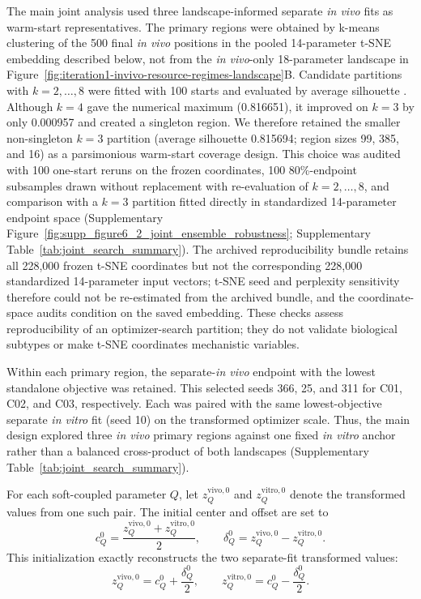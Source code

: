 \documentclass[11pt]{article}
\begin{document}
The main joint analysis used three landscape-informed separate \textit{in vivo} fits as warm-start representatives. The primary regions were obtained by k-means clustering of the 500 final \textit{in vivo} positions in the pooled 14-parameter t-SNE embedding described below, not from the \textit{in vivo}-only 18-parameter landscape in Figure~\ref{fig:iteration1-invivo-resource-regimes-landscape}B. Candidate partitions with $k=2,\ldots,8$ were fitted with 100 starts and evaluated by average silhouette \cite{rousseeuw_silhouettes_1987}. Although $k=4$ gave the numerical maximum (0.816651), it improved on $k=3$ by only 0.000957 and created a singleton region. We therefore retained the smaller non-singleton $k=3$ partition (average silhouette 0.815694; region sizes 99, 385, and 16) as a parsimonious warm-start coverage design. This choice was audited with 100 one-start reruns on the frozen coordinates, 100 80\%-endpoint subsamples drawn without replacement with re-evaluation of $k=2,\ldots,8$, and comparison with a $k=3$ partition fitted directly in standardized 14-parameter endpoint space (Supplementary Figure~\ref{fig:supp_figure6_2_joint_ensemble_robustness}; Supplementary Table~\ref{tab:joint_search_summary}). The archived reproducibility bundle retains all 228,000 frozen t-SNE coordinates but not the corresponding 228,000 standardized 14-parameter input vectors; t-SNE seed and perplexity sensitivity therefore could not be re-estimated from the archived bundle, and the coordinate-space audits condition on the saved embedding. These checks assess reproducibility of an optimizer-search partition; they do not validate biological subtypes or make t-SNE coordinates mechanistic variables.

Within each primary region, the separate-\textit{in vivo} endpoint with the lowest standalone objective was retained. This selected seeds 366, 25, and 311 for C01, C02, and C03, respectively. Each was paired with the same lowest-objective separate \textit{in vitro} fit (seed 10) on the transformed optimizer scale. Thus, the main design explored three \textit{in vivo} primary regions against one fixed \textit{in vitro} anchor rather than a balanced cross-product of both landscapes (Supplementary Table~\ref{tab:joint_search_summary}).

For each soft-coupled parameter $Q$, let $z_Q^{\mathrm{vivo},0}$ and $z_Q^{\mathrm{vitro},0}$ denote the transformed values from one such pair. The initial center and offset are set to
\begin{equation}
c_Q^{0} = \frac{z_Q^{\mathrm{vivo},0} + z_Q^{\mathrm{vitro},0}}{2}, \qquad \delta_Q^{0} = z_Q^{\mathrm{vivo},0} - z_Q^{\mathrm{vitro},0}.
\label{eq:appendix_joint_warm_start_soft}
\end{equation}
This initialization exactly reconstructs the two separate-fit transformed values:
\[
z_Q^{\mathrm{vivo},0} = c_Q^0+\frac{\delta_Q^0}{2}, \qquad z_Q^{\mathrm{vitro},0} = c_Q^0-\frac{\delta_Q^0}{2}.
\]
\end{document}
